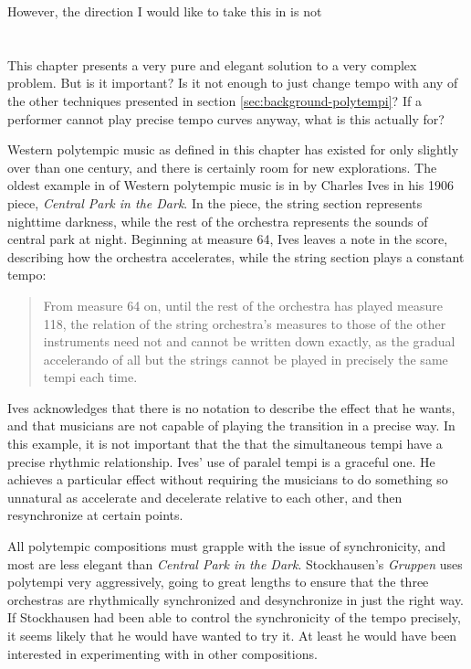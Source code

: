 However, the direction I would like to take this in is not 

\section{\polytempic}
This chapter presents a very pure and elegant solution to a very
complex problem. But is it important? Is it not enough to just change
tempo with any of the other techniques presented in section
\ref{sec:background-polytempi}? If a performer cannot play precise tempo
curves anyway, what is this actually for?

Western polytempic music as defined in this chapter has existed for
only slightly over than one century, and there is certainly room for
new explorations. The oldest example in of Western polytempic music is
in by Charles Ives in his 1906 piece, \textit{Central Park in the
  Dark}.\cite{Greschak2003} In the piece, the string section
represents nighttime darkness, while the rest of the orchestra
represents the sounds of central park at night. Beginning at measure
64, Ives leaves a note in the score, describing how the orchestra
accelerates, while the string section plays a constant tempo:
\begin{quotation}
  From measure 64 on, until the rest of the orchestra has played
  measure 118, the relation of the string orchestra's measures to
  those of the other instruments need not and cannot be written down
  exactly, as the gradual accelerando of all but the strings cannot be
  played in precisely the same tempi each time.
\end{quotation}
Ives acknowledges that there is no notation to describe the effect
that he wants, and that musicians are not capable of playing the
transition in a precise way. In this example, it is not important that
the that the simultaneous tempi have a precise rhythmic
relationship. Ives' use of paralel tempi is a graceful one. He
achieves a particular effect without requiring the musicians to do
something so unnatural as accelerate and decelerate relative to each
other, and then resynchronize at certain points. 

All polytempic compositions must grapple with the issue of
synchronicity, and most are less elegant than \textit{Central Park in
  the Dark}. Stockhausen's \textit{Gruppen} uses polytempi very
aggressively, going to great lengths to ensure that the three
orchestras are rhythmically synchronized and desynchronize in just the
right way.  If Stockhausen had been able to control the synchronicity
of the tempo precisely, it seems likely that he would have wanted
to try it. At least he would have been interested in experimenting with
\polytempic in other compositions.

